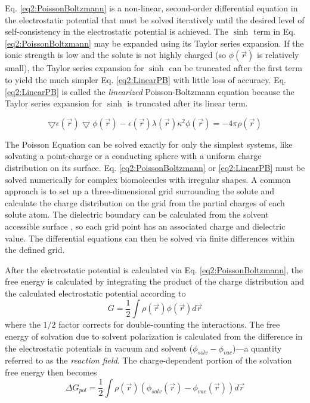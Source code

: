 Eq. \ref{eq2:PoissonBoltzmann} is a non-linear, second-order differential
equation in the electrostatic potential that must be solved iteratively until
the desired level of self-consistency in the electrostatic potential is
achieved. The $\sinh$ term in Eq. \ref{eq2:PoissonBoltzmann} may be expanded
using its Taylor series expansion. If the ionic strength is low and the solute
is not highly charged (so $\phi(\vec{r})$ is relatively small), the Taylor
series expansion for $\sinh$ can be truncated after the first term to yield the
much simpler Eq. \ref{eq2:LinearPB} with little loss of accuracy. Eq.
\ref{eq2:LinearPB} is called the \emph{linearized} Poisson-Boltzmann equation
because the Taylor series expansion for $\sinh$ is truncated after its linear
term.

\begin{equation}
   \bigtriangledown \epsilon (\vec{r}) \bigtriangledown \phi(\vec{r}) -
         \epsilon(\vec{r}) \lambda(\vec{r}) \kappa ^ 2 \phi(\vec{r}) = -4 \pi
         \rho(\vec{r})
   \label{eq2:LinearPB}
\end{equation}

The Poisson Equation can be solved exactly for only the simplest systems, like
solvating a point-charge or a conducting sphere with a uniform charge
distribution on its surface. Eq. \ref{eq2:PoissonBoltzmann} or
\ref{eq2:LinearPB} must be solved numerically for complex biomolecules with
irregular shapes. A common approach is to set up a three-dimensional grid
surrounding the solute and calculate the charge distribution on the grid from
the partial charges of each solute atom.  The dielectric boundary can be
calculated from the solvent accessible surface
\cite{Sitkoff_JPhysChem_1994_v98_p1978}, so each grid point has an associated
charge and dielectric value. The differential equations can then be solved via
finite differences within the defined grid. \cite{Klapper_Proteins_1986_v1_p47}

After the electrostatic potential is calculated via Eq.
\ref{eq2:PoissonBoltzmann}, the free energy is calculated by integrating the
product of the charge distribution and the calculated electrostatic potential
according to
\begin{equation*}
   G = \frac 1 2 \int \rho(\vec{r}) \phi(\vec{r}) d\vec{r}
\end{equation*}
where the $1/2$ factor corrects for double-counting the interactions.  The free
energy of solvation due to solvent polarization is calculated from the
difference in the electrostatic potentials in vacuum and solvent ($\phi_{solv} -
\phi_{vac}$)---a quantity referred to as the \emph{reaction field}.
\cite{Leach_Book_MolModel_2001} The charge-dependent portion of the solvation
free energy then becomes
\begin{equation}
   \Delta G _ {pol} = \frac 1 2 \int \rho(\vec{r}) \left ( \phi_{solv}(\vec{r})
      - \phi_{vac}(\vec{r}) \right ) d\vec{r}
   \label{eq2:ReactionField}
\end{equation}

